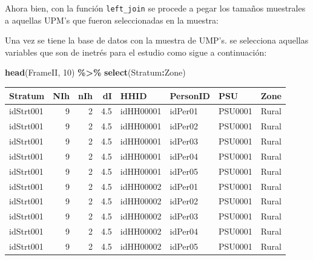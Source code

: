 \documentclass[
  spanish,
  12pt,
]{book}
\newenvironment{Shaded}{\begin{snugshade}}{\end{snugshade}}
\newcommand{\DecValTok}[1]{\textcolor[rgb]{0.00,0.00,0.81}{#1}}
\newcommand{\FunctionTok}[1]{\textcolor[rgb]{0.13,0.29,0.53}{\textbf{#1}}}
\newcommand{\NormalTok}[1]{#1}
\newcommand{\OtherTok}[1]{\textcolor[rgb]{0.56,0.35,0.01}{#1}}
\newcommand{\SpecialCharTok}[1]{\textcolor[rgb]{0.81,0.36,0.00}{\textbf{#1}}}
\begin{document}
\begin{Shaded}
\end{Shaded}

Ahora bien, con la función \texttt{left\_join} se procede a pegar los tamaños muestrales a aquellas UPM's que fueron seleccionadas en la muestra:

\begin{Shaded}
\end{Shaded}

Una vez se tiene la base de datos con la muestra de UMP's. se selecciona aquellas variables que son de inetrés para el estudio como sigue a continuación:

\begin{Shaded}
\begin{Highlighting}[]
\FunctionTok{head}\NormalTok{(FrameII, }\DecValTok{10}\NormalTok{) }\SpecialCharTok{\%\textgreater{}\%} \FunctionTok{select}\NormalTok{(Stratum}\SpecialCharTok{:}\NormalTok{Zone)}
\end{Highlighting}
\end{Shaded}

\begin{tabular}{l|r|r|r|l|l|l|l}
\hline
Stratum & NIh & nIh & dI & HHID & PersonID & PSU & Zone\\
\hline
idStrt001 & 9 & 2 & 4.5 & idHH00001 & idPer01 & PSU0001 & Rural\\
\hline
idStrt001 & 9 & 2 & 4.5 & idHH00001 & idPer02 & PSU0001 & Rural\\
\hline
idStrt001 & 9 & 2 & 4.5 & idHH00001 & idPer03 & PSU0001 & Rural\\
\hline
idStrt001 & 9 & 2 & 4.5 & idHH00001 & idPer04 & PSU0001 & Rural\\
\hline
idStrt001 & 9 & 2 & 4.5 & idHH00001 & idPer05 & PSU0001 & Rural\\
\hline
idStrt001 & 9 & 2 & 4.5 & idHH00002 & idPer01 & PSU0001 & Rural\\
\hline
idStrt001 & 9 & 2 & 4.5 & idHH00002 & idPer02 & PSU0001 & Rural\\
\hline
idStrt001 & 9 & 2 & 4.5 & idHH00002 & idPer03 & PSU0001 & Rural\\
\hline
idStrt001 & 9 & 2 & 4.5 & idHH00002 & idPer04 & PSU0001 & Rural\\
\hline
idStrt001 & 9 & 2 & 4.5 & idHH00002 & idPer05 & PSU0001 & Rural\\
\hline
\end{tabular}
\end{document}

